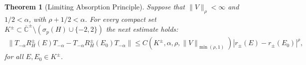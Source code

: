 \documentclass[12pt,oneside,onecolumn,open]{article}
\newtheorem{teo}{Theorem}[section]
\begin{document}
\begin{teo}[Limiting Absorption Principle]\label{LAPmain}  Suppose that $\|  V \|
  _{\rho} < \infty $ and $1/2<\alpha $,  with  $ \rho + 1/2 <  \alpha   $.  %
 For every  compact set $ K^{\pm} \subset  \overline{\mathbb{C}}^\pm \setminus (\sigma_p(H ) \cup \{ -2, 2\}  )$  the next estimate holds: 
        \begin{align}\label{Ger2}
            \|T_{-\alpha }R^{\pm}_{H}(E)T_{-\alpha }-T_{-\alpha }R^{\pm}_{H}(E_0 )T_{-\alpha }\|\leq C(K^{\pm}, \alpha, \rho, \| V \|_{\min(\rho, 1)}) |r_\pm(E)-r_\pm (E_0)|^{   \rho },
        \end{align}
   for all  $ E , E_0\in K^{\pm}$. %
\end{teo}
\end{document}
